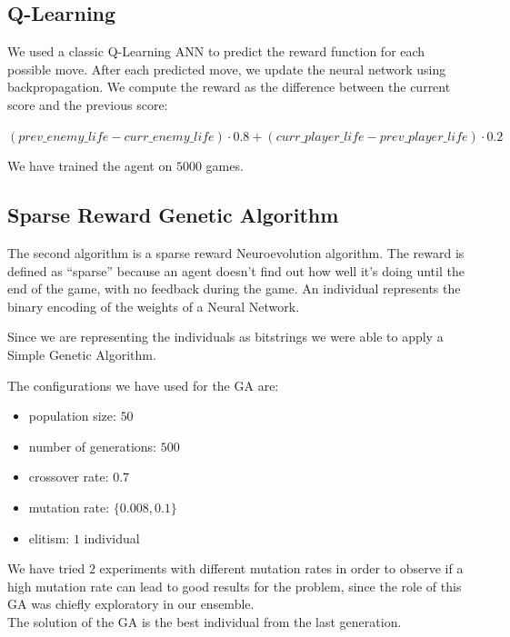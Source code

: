 \documentclass[conference]{IEEEtran}
\begin{document}
    
    \subsection{Q-Learning}\label{subsec:q-learning}
    We used a classic Q-Learning ANN to predict the reward function for each possible move.
    After each predicted move, we update the neural network using backpropagation. We compute the reward as the difference between the current score and the previous score:
    
    $ (prev\_enemy\_life - curr\_enemy\_life) \cdot 0.8 + (curr\_player\_life - prev\_player\_life) \cdot 0.2 $
    
    We have trained the agent on $5000$ games.

    \subsection{Sparse Reward Genetic Algorithm}
    The second algorithm is a sparse reward Neuroevolution\cite{neuro} algorithm.
    The reward is defined as ``sparse'' because an agent doesn't find out how well it's doing until
    the end of the game, with no feedback during the game.
    An individual represents the binary encoding of the weights of a Neural Network.

    Since we are representing the individuals as bitstrings we were able to apply
    a Simple Genetic Algorithm\cite{genetic_algorithm}.

    
    The configurations we have used for the GA are:
    \begin{itemize}
        \item population size: $50$
        \item number of generations: $500$
        \item crossover rate: $0.7$
        \item mutation rate: $\{0.008, 0.1\}$
        \item elitism: $1$ individual
    \end{itemize}
    We have tried $2$ experiments with different mutation rates in order to observe if a high
    mutation rate can lead to good results for the problem, since the role of this GA was
    chiefly exploratory in our ensemble. \\

    The solution of the GA is the best individual from the last generation.
\end{document}
